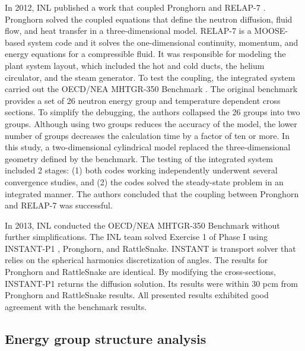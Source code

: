\documentclass[11pt,letterpaper]{article}
\begin{document}
In 2012, \gls{INL} published a work \cite{j_ortensi_initial_2012} that coupled Pronghorn and RELAP-7 \cite{andrs_relap-7_2012}.
Pronghorn solved the coupled equations that define the neutron diffusion, fluid flow, and heat transfer in a three-dimensional model.
RELAP-7 is a MOOSE-based system code and it solves the one-dimensional continuity, momentum, and energy equations for a compressible fluid.
It was responsible for modeling the plant system layout, which included the hot and cold ducts, the helium circulator, and the steam generator.
To test the coupling, the integrated system carried out the OECD/NEA MHTGR-350 Benchmark \cite{oecd_nea_coupled_2020}.
The original benchmark provides a set of 26 neutron energy group and temperature dependent cross sections.
To simplify the debugging, the authors collapsed the 26 groups into two groups.
Although using two groups reduces the accuracy of the model, the lower number of groups decreases the calculation time by a factor of ten or more.
In this study, a two-dimensional cylindrical model replaced the three-dimensional geometry defined by the benchmark.
The testing of the integrated system included 2 stages: (1) both codes working independently underwent several convergence studies, and (2) the codes solved the steady-state problem in an integrated manner.
The authors concluded that the coupling between Pronghorn and RELAP-7 was successful.

In 2013, \gls{INL} conducted the OECD/NEA MHTGR-350 Benchmark \cite{strydom_inl_2013} without further simplifications.
The \gls{INL} team solved Exercise 1 of Phase I using INSTANT-P1 \cite{wang_krylov_2011}, Pronghorn, and RattleSnake.
INSTANT is transport solver that relies on the spherical harmonics discretization of angles.
The results for Pronghorn and RattleSnake are identical.
By modifying the cross-sections, INSTANT-P1 returns the diffusion solution.
Its results were within 30 pcm from Pronghorn and RattleSnake results.
All presented results exhibited good agreement with the benchmark results.

\subsection{Energy group structure analysis}
\end{document}
